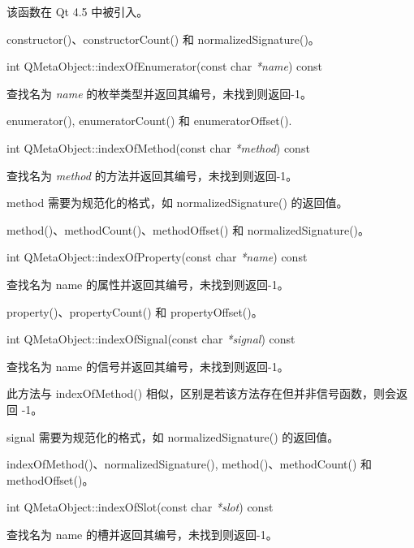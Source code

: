 该函数在 Qt 4.5 中被引入。

\begin{seeAlso}
constructor()、constructorCount() 和 normalizedSignature()。
\end{seeAlso}

int QMetaObject::indexOfEnumerator(const char \emph{*name}) const

查找名为 \emph{name} 的枚举类型并返回其编号，未找到则返回-1。

\begin{notice}
enumerator(), enumeratorCount() 和 enumeratorOffset().
\end{notice}

int QMetaObject::indexOfMethod(const char \emph{*method}) const

查找名为 \emph{method} 的方法并返回其编号，未找到则返回-1。

\begin{notice}
method 需要为规范化的格式，如 normalizedSignature() 的返回值。
\end{notice}

\begin{seeAlso}
method()、methodCount()、methodOffset() 和 normalizedSignature()。
\end{seeAlso}

int QMetaObject::indexOfProperty(const char \emph{*name}) const

查找名为 name 的属性并返回其编号，未找到则返回-1。

\begin{seeAlso}
property()、propertyCount() 和 propertyOffset()。	
\end{seeAlso}

int QMetaObject::indexOfSignal(const char \emph{*signal}) const

查找名为 name 的信号并返回其编号，未找到则返回-1。

此方法与 indexOfMethod() 相似，区别是若该方法存在但并非信号函数，则会返回 -1。

\begin{notice}
signal 需要为规范化的格式，如 normalizedSignature() 的返回值。	
\end{notice}

\begin{seeAlso}
indexOfMethod()、normalizedSignature(), method()、methodCount() 和 methodOffset()。
\end{seeAlso}

int QMetaObject::indexOfSlot(const char \emph{*slot}) const

查找名为 name 的槽并返回其编号，未找到则返回-1。

